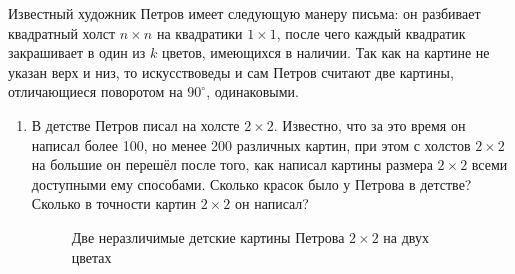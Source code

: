 Известный художник Петров имеет следующую манеру письма: он разбивает квадратный холст $n\times n$ на квадратики $1\times 1$, после чего каждый квадратик закрашивает в один из $k$ цветов, имеющихся в наличии. Так как на картине не указан верх и низ, то искусствоведы и сам Петров считают две картины, отличающиеся поворотом на $90^{\circ}$, одинаковыми.
\begin{enumerate}
\item В детстве Петров писал на холсте $2\times 2$. Известно, что за это время он написал более 100, но менее 200 различных картин, при этом с холстов $2\times 2$ на большие он перешёл после того, как написал картины размера $2\times 2$ всеми доступными ему способами. Сколько красок было у Петрова в детстве? Сколько в точности картин $2\times 2$ он написал?

\begin{figure}[h]
\begin{center}
\end{center}
\caption{Две неразличимые детские картины Петрова $2\times 2$ на двух цветах}
\end{figure}


\end{enumerate}
